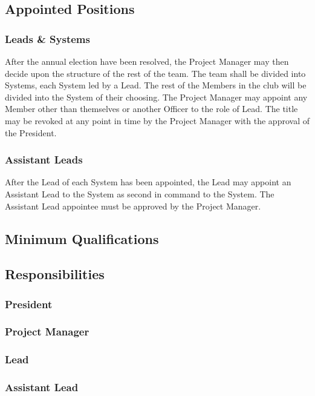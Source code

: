 \subsection{Appointed Positions}
\label{roles:appointed}

\subsubsection{Leads \& Systems}
\label{roles:appointed:leads}
After the annual election have been resolved, the Project Manager may then decide upon the structure of the rest of the team. The team shall be divided into Systems, each System led by a Lead. The rest of the Members in the club will be divided into the System of their choosing. The Project Manager may appoint any Member other than themselves or another Officer to the role of Lead. The title may be revoked at any point in time by the Project Manager with the approval of the President.

\subsubsection{Assistant Leads}
\label{roles:appointed:assistant}
After the Lead of each System has been appointed, the Lead may appoint an Assistant Lead to the System as second in command to the System. The Assistant Lead appointee must be approved by the Project Manager.

\subsection{Minimum Qualifications}
\label{roles:qualifications}

\subsection{Responsibilities}
\label{roles:responsibilities}

\subsubsection{President}
\label{roles:responsibilities:president}

\subsubsection{Project Manager}
\label{roles:responsibilities:pm}

\subsubsection{Lead}
\label{roles:responsibilities:lead}

\subsubsection{Assistant Lead}
\label{roles:responsibilities:assistant}
